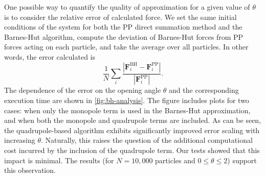 One possible way to quantify the quality of approximation for a given value of $\theta$ is to consider the relative error of calculated force.
We set the same initial conditions of the system for both the PP direct summation method and the Barnes-Hut algorithm, compute the deviation of Barnes-Hut forces from PP forces acting on each particle, and take the average over all particles.
In other words, the error calculated is
\begin{equation*}
    \frac{1}{N}\sum_{i} \frac{|\mathbf{F}_i^\text{BH} - \mathbf{F}_i^\text{PP}|}{|\mathbf{F}_i^\text{PP}|}.
\end{equation*}
The dependence of the error on the opening angle $\theta$ and the corresponding execution time are shown in \autoref{fig:bh-analysis}.
The figure includes plots for two cases: when only the monopole term is used in the Barnes-Hut approximation, and when both the monopole and quadrupole terms are included.
As can be seen, the quadrupole-based algorithm exhibits significantly improved error scaling with increasing $\theta$.
Naturally, this raises the question of the additional computational cost incurred by the inclusion of the quadrupole term.
Our tests showed that this impact is minimal.
The results (for $N = 10{,}000$ particles and $0 \leq \theta \leq 2$) support this observation.
